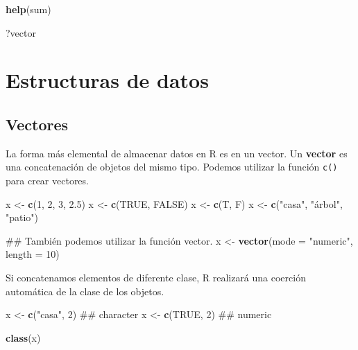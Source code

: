 \documentclass[spanish,]{book}
\newenvironment{Shaded}{\begin{snugshade}}{\end{snugshade}}
\newcommand{\KeywordTok}[1]{\textcolor[rgb]{0.13,0.29,0.53}{\textbf{#1}}}
\newcommand{\DataTypeTok}[1]{\textcolor[rgb]{0.13,0.29,0.53}{#1}}
\newcommand{\DecValTok}[1]{\textcolor[rgb]{0.00,0.00,0.81}{#1}}
\newcommand{\FloatTok}[1]{\textcolor[rgb]{0.00,0.00,0.81}{#1}}
\newcommand{\StringTok}[1]{\textcolor[rgb]{0.31,0.60,0.02}{#1}}
\newcommand{\OtherTok}[1]{\textcolor[rgb]{0.56,0.35,0.01}{#1}}
\newcommand{\NormalTok}[1]{#1}
\begin{document}
\begin{Shaded}
\begin{Highlighting}[]
\KeywordTok{help}\NormalTok{(sum)}

\NormalTok{?vector}
\end{Highlighting}
\end{Shaded}

\chapter{Estructuras de datos}\label{estructuras-de-datos}

\section{Vectores}\label{vectores}

La forma más elemental de almacenar datos en R es en un vector. Un
\textbf{vector} es una concatenación de objetos del mismo tipo. Podemos
utilizar la función \texttt{c()} para crear vectores.

\begin{Shaded}
\begin{Highlighting}[]
\NormalTok{x <-}\StringTok{ }\KeywordTok{c}\NormalTok{(}\DecValTok{1}\NormalTok{, }\DecValTok{2}\NormalTok{, }\DecValTok{3}\NormalTok{, }\FloatTok{2.5}\NormalTok{)}
\NormalTok{x <-}\StringTok{ }\KeywordTok{c}\NormalTok{(}\OtherTok{TRUE}\NormalTok{, }\OtherTok{FALSE}\NormalTok{)}
\NormalTok{x <-}\StringTok{ }\KeywordTok{c}\NormalTok{(T, F)}
\NormalTok{x <-}\StringTok{ }\KeywordTok{c}\NormalTok{(}\StringTok{"casa"}\NormalTok{, }\StringTok{"árbol"}\NormalTok{, }\StringTok{"patio"}\NormalTok{)}

\NormalTok{## También podemos utilizar la función vector.}
\NormalTok{x <-}\StringTok{ }\KeywordTok{vector}\NormalTok{(}\DataTypeTok{mode =} \StringTok{"numeric"}\NormalTok{, }\DataTypeTok{length =} \DecValTok{10}\NormalTok{)}
\end{Highlighting}
\end{Shaded}

Si concatenamos elementos de diferente clase, R realizará una coerción
automática de la clase de los objetos.

\begin{Shaded}
\begin{Highlighting}[]
\NormalTok{x <-}\StringTok{ }\KeywordTok{c}\NormalTok{(}\StringTok{"casa"}\NormalTok{, }\DecValTok{2}\NormalTok{) ## character}
\NormalTok{x <-}\StringTok{ }\KeywordTok{c}\NormalTok{(}\OtherTok{TRUE}\NormalTok{, }\DecValTok{2}\NormalTok{) ## numeric}

\KeywordTok{class}\NormalTok{(x)}
\end{Highlighting}
\end{Shaded}
\end{document}
